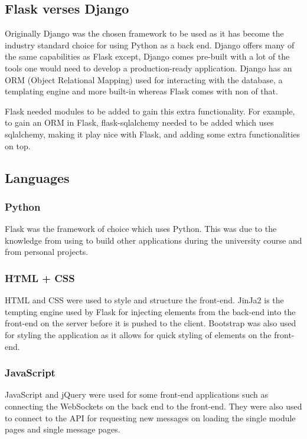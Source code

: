 \subsection{Flask verses Django}
Originally Django was the chosen framework to be used as it has become the industry standard choice for using Python as a back end. Django offers many of the same capabilities as Flask except, Django comes pre-built with a lot of the tools one would need to develop a production-ready application. Django has an ORM (Object Relational Mapping) used for interacting with the database, a templating engine and more built-in whereas Flask comes with non of that. 

Flask needed modules to be added to gain this extra functionality. For example, to gain an ORM in Flask, flask-sqlalchemy needed to be added which uses sqlalchemy, making it play nice with Flask, and adding some extra functionalities on top.


\subsection{Languages}

\subsubsection{Python}
Flask was the framework of choice which uses Python. This was due to the knowledge from using to build other applications during the university course and from personal projects.

\subsubsection{HTML + CSS}
HTML and CSS were used to style and structure the front-end. JinJa2 is the tempting engine used by Flask for injecting elements from the back-end into the front-end on the server before it is pushed to the client. Bootstrap was also used for styling the application as it allows for quick styling of elements on the front-end.

\subsubsection{JavaScript}
JavaScript and jQuery were used for some front-end applications such as connecting the WebSockets on the back end to the front-end. They were also used to connect to the API for requesting new messages on loading the single module pages and single message pages.


